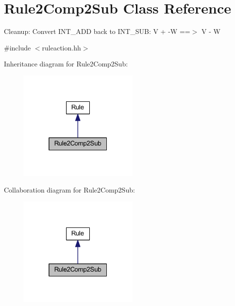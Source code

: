 \hypertarget{class_rule2_comp2_sub}{}\section{Rule2\+Comp2\+Sub Class Reference}
\label{class_rule2_comp2_sub}


Cleanup\+: Convert I\+N\+T\+\_\+\+A\+DD back to I\+N\+T\+\_\+\+S\+UB\+: {\ttfamily V + -\/W ==$>$ V -\/ W}  




{\ttfamily \#include $<$ruleaction.\+hh$>$}



Inheritance diagram for Rule2\+Comp2\+Sub\+:
\nopagebreak
\begin{figure}[H]
\begin{center}
\leavevmode
\includegraphics[width=169pt]{class_rule2_comp2_sub__inherit__graph}
\end{center}
\end{figure}


Collaboration diagram for Rule2\+Comp2\+Sub\+:
\nopagebreak
\begin{figure}[H]
\begin{center}
\leavevmode
\includegraphics[width=169pt]{class_rule2_comp2_sub__coll__graph}
\end{center}
\end{figure}
